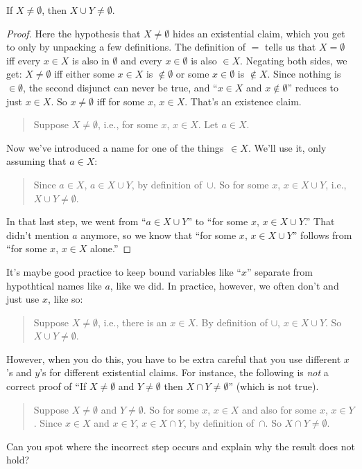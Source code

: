 \documentclass[../../../include/open-logic-section]{subfiles}
\begin{document}
\begin{prop}
If $X \neq \emptyset$, then $X \cup Y \neq \emptyset$.
\end{prop}

\begin{proof}
Here the hypothesis that $X \neq \emptyset$ hides an existential
claim, which you get to only by unpacking a few definitions. The
definition of $=$ tells us that $X = \emptyset$ iff every $x \in X$ is
also in $\emptyset$ and every $x \in \emptyset$ is also $\in
X$. Negating both sides, we get: $X \neq \emptyset$ iff either some $x
\in X$ is $\notin \emptyset$ or some $x \in \emptyset$ is $\notin
X$. Since nothing is $\in \emptyset$, the second disjunct can never be
true, and ``$x \in X$ and $x \notin \emptyset$'' reduces to just $x
\in X$. So $x \neq \emptyset$ iff for some $x$, $x \in X$. That's an
existence claim.
\begin{quote}
Suppose $X \neq \emptyset$, i.e., for some $x$, $x \in X$. Let $a \in
X$.
\end{quote}
Now we've introduced a name for one of the things~$\in X$. We'll use
it, only assuming that $a \in X$:
\begin{quote}
Since $a \in X$, $a \in X \cup Y$, by definition of~$\cup$. So for
some $x$, $x \in X \cup Y$, i.e., $X \cup Y \neq \emptyset$.
\end{quote}
In that last step, we went from ``$a \in X \cup Y$'' to ``for some
$x$, $x \in X \cup Y$.'' That didn't mention $a$ anymore, so we know
that ``for some $x$, $x \in X \cup Y$'' follows from ``for some $x$, $x
\in X$ alone.''
\end{proof}

It's maybe good practice to keep bound variables like ``$x$'' separate
from hypothtical names like $a$, like we did. In practice, however, we
often don't and just use $x$, like so:
\begin{quote}
Suppose $X \neq \emptyset$, i.e., there is an $x \in X$. By definition
of $\cup$, $x \in X \cup Y$. So $X \cup Y \neq \emptyset$.
\end{quote}
However, when you do this, you have to be extra careful that you use
different $x$'s and $y$'s for different existential claims. For
instance, the following is \emph{not} a correct proof of ``If $X \neq
\emptyset$ and $Y \neq \emptyset$ then $X \cap Y \neq \emptyset$''
(which is not true).
\begin{quote}
Suppose $X \neq \emptyset$ and $Y \neq \emptyset$. So for some $x$, $x
\in X$ and also for some $x$, $x \in Y$. Since $x \in X$ and $x \in
Y$, $x \in X \cap Y$, by definition of~$\cap$. So $X \cap Y \neq
\emptyset$.
\end{quote}
Can you spot where the incorrect step occurs and explain why the
result does not hold?
\end{document}
